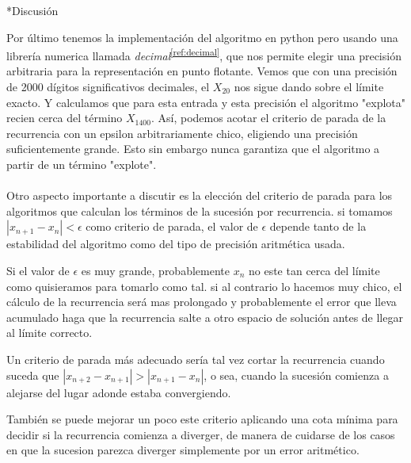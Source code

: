\documentclass[12pt,titlepage]{article}
\newenvironment{usection}[1]{\newpage\begin{section}*{#1}	\addcontentsline{toc}{section}{#1}}{\end{section}}
\newcommand{\superref}[1]{\textsuperscript{\ref{#1}}}
\begin{document}
\begin{usection}{Discusión}
		Por último tenemos la implementación del algoritmo en python
		pero usando una librería numerica llamada \textit{decimal}\superref{ref:decimal},
		que nos permite elegir una precisión arbitraria para
		la representación en punto flotante.
		Vemos que con una precisión de 2000 dígitos significativos decimales,
		el $X_{20}$ nos sigue dando sobre el límite exacto.
		Y calculamos que para esta entrada y esta precisión
		el algoritmo "explota" recien cerca del término $X_{1400}$.
		Así, podemos acotar el criterio de parada de la recurrencia
		con un epsilon arbitrariamente chico, eligiendo una precisión
		suficientemente grande. Esto sin embargo nunca garantiza
		que el algoritmo a partir de un término "explote". \\
\\
		Otro aspecto importante a discutir es la elección
		del criterio de parada para los algoritmos
		que calculan los términos de la sucesión por recurrencia.
		si tomamos $|x_{n+1}-x_n| < \epsilon$ como criterio de parada,
		el valor de $\epsilon$ depende tanto de la estabilidad
		del algoritmo como del tipo de precisión aritmética usada.

		Si el valor de $\epsilon$ es muy grande, probablemente $x_n$
		no este tan cerca del límite como quisieramos para tomarlo como tal.
		si al contrario lo hacemos muy chico, el cálculo de la recurrencia
		será mas prolongado y probablemente el error que lleva acumulado
		haga que la recurrencia salte a otro espacio de solución antes de llegar al límite correcto.

		Un criterio de parada más adecuado sería tal vez
		cortar la recurrencia cuando suceda que
		$|x_{n+2}-x_{n+1}| > |x_{n+1}-x_n|$, o sea, cuando la sucesión
		comienza a alejarse del lugar adonde estaba convergiendo.

		También se puede mejorar un poco este criterio
		aplicando una cota mínima para decidir
		si la recurrencia comienza a diverger, de manera
		de cuidarse de los casos en que la sucesion parezca diverger
		simplemente por un error aritmético.

	\end{usection}
	
\end{document}
